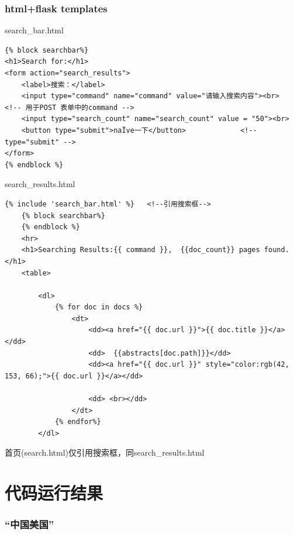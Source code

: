\documentclass[12pt,a4paper]{article}
\begin{document}
\subsubsection{html+flask templates}
search{\_}bar.html
\begin{lstlisting}[style=htmlcssjs]
{% block searchbar%}
<h1>Search for:</h1>
<form action="search_results">
    <label>搜索：</label>
    <input type="command" name="command" value="请输入搜索内容"><br>    <!-- 用于POST 表单中的command -->
    <input type="search_count" name="search_count" value = "50"><br>
    <button type="submit">naÏve一下</button>             <!-- type="submit" -->
</form>
{% endblock %}
\end{lstlisting}

search{\_}results.html
\begin{lstlisting}[style=htmlcssjs]
	{% include 'search_bar.html' %}   <!--引用搜索框-->
    {% block searchbar%}
    {% endblock %}
    <hr>
    <h1>Searching Results:{{ command }},  {{doc_count}} pages found.</h1>
    <table>
       
        <dl>
            {% for doc in docs %}
                <dt>
                    <dd><a href="{{ doc.url }}">{{ doc.title }}</a></dd>
                    <dd>  {{abstracts[doc.path]}}</dd>
                    <dd><a href="{{ doc.url }}" style="color:rgb(42, 153, 66);">{{ doc.url }}</a></dd>
                    
                    <dd> <br></dd>
                </dt>
            {% endfor%}
        </dl>
\end{lstlisting}
首页(search.html)仅引用搜索框，同search{\_}results.html
\section{代码运行结果}

\subsubsection{“中国美国”}
\end{document}

